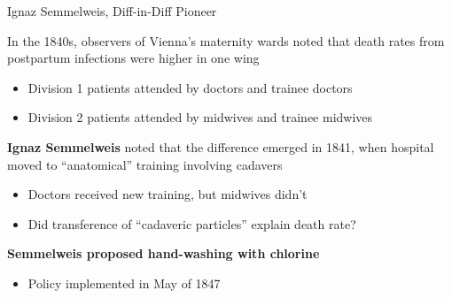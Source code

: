 \documentclass[10pt,xcolor=table,ignorenonframetext,handout,aspectratio=169]{beamer}
\newlength{\wideitemsep}
\let\olditem\item
\renewcommand{\item}{\setlength{\itemsep}{\wideitemsep}\olditem}
\begin{document}

\begin{frame}{Ignaz Semmelweis, Diff-in-Diff Pioneer}

\medskip
In the 1840s, observers of Vienna's maternity wards noted that death rates from postpartum infections were higher in one wing

\medskip
\begin{itemize}
	
	\item Division 1 patients attended by doctors and trainee doctors
	
	\item Division 2 patients attended by midwives and trainee midwives
	
\end{itemize}

\pause
\medskip
\textbf{Ignaz Semmelweis} noted that the difference emerged in 1841, when hospital moved to ``anatomical'' training involving cadavers

\medskip
\begin{itemize}
	
	\item Doctors received new training, but midwives didn't
	
	\item Did transference of ``cadaveric particles'' explain death rate?
	
\end{itemize}

\pause
\medskip
\textbf{Semmelweis proposed hand-washing with chlorine}

\medskip
\begin{itemize}
	
	\item Policy implemented in May of 1847
	
\end{itemize}


\end{frame}


\end{document}
